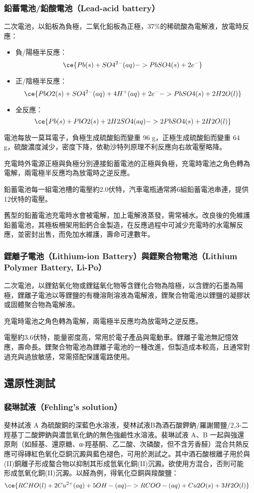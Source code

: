 \documentclass[a4paper,12pt]{report}
\begin{document}
\begin{itemize}
\begin{itemize}
\subsubsection{鉛蓄電池/鉛酸電池（Lead-acid battery）}
二次電池，以鉛板為負極，二氧化鉛板為正極，37\%的稀硫酸為電解液，放電時反應：
\begin{itemize}
\item 負/陽極半反應：
\[\ce{Pb(s) + SO4^{2-}(aq) -> PbSO4(s) + 2e^-}\]
\item 正/陰極半反應：
\[\ce{PbO2(s) + SO4^{2-}(aq) + 4H^+(aq) + 2e^- -> PbSO4(s) + 2H2O(l)}\]
\item 全反應：
\[\ce{Pb(s) + PbO2(s) + 2H2SO4(aq) -> 2PbSO4(s) + 2H2O(l)}\]
\end{itemize}
電池每放一莫耳電子，負極生成硫酸鉛而變重 96 g，正極生成硫酸鉛而變重 64 g，硫酸濃度減少，密度下降，依勒沙特列原理不利反應向右故電壓略降。

充電時外電源正極與負極分別連接鉛蓄電池的正極與負極，充電時電池之角色轉為電解，兩電極半反應均為放電時之逆反應。

鉛蓄電池每一組電池槽的電壓約2.0伏特，汽車電瓶通常將6組鉛蓄電池串連，提供12伏特的電壓。

舊型的鉛蓄電池充電時水會被電解，加上電解液蒸發，需常補水。改良後的免維護鉛蓄電池，其極板柵架用鉛鈣合金製造，在反應過程中可減少充電時的水電解反應，並密封出售，而免加水維護，壽命可達數年。
\subsubsection{鋰離子電池（Lithium-ion Battery）與鋰聚合物電池（Lithium Polymer Battery, Li-Po）}
二次電池，以鋰鈷氧化物或鋰錳氧化物等含鋰化合物為陰極，以含鋰的石墨為陽極，鋰離子電池以等鋰鹽的有機溶劑溶液為電解液，鋰聚合物電池以鋰鹽的凝膠狀或固體聚合物為電解液。

充電時電池之角色轉為電解，兩電極半反應均為放電時之逆反應。

電壓約3.6伏特，能量密度高，常用於電子產品與電動車。鋰離子電池無記憶效應，壽命長。鋰聚合物電池為鋰離子電池的一種改進，但製造成本較高，且通常對過充與過放敏感，常需搭配保護電路使用。
\subsection{還原性測試}
\subsubsection{裴琳試液（Fehling's solution）}
斐林試液 A 為硫酸銅的深藍色水溶液，斐林試液B為酒石酸鉀鈉/羅謝爾鹽/2,3-二羥基丁二酸鉀鈉與濃氫氧化鈉的無色強鹼性水溶液。裴琳試液 A、B 一起與強還原劑（如醛基、還原糖、α-羥基酮、乙二酸、次磷酸，但不含芳香醛）混合共熱反應可得磚紅色氧化亞銅沉澱與藍色褪色，可用於測試之。其中酒石酸根離子用於與(II)銅離子形成螯合物以抑制其形成氫氧化銅(II)沉澱。欲使用方混合，否則可能形成氫氧化銅(II)沉澱。以醛為例，得氧化亞銅與羧酸鹽：
\[\ce{RCHO(l) + 2Cu^{2+}(aq) + 5OH-(aq) -> RCOO-(aq) + Cu2O(s) + 3H2O(l)}\]

\end{itemize}
\end{itemize}
\end{document}

